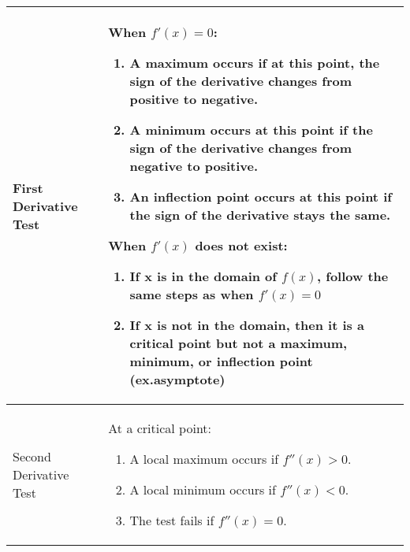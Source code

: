 \documentclass{ximera}
\begin{document}
\begin{tabular}{| l | p{7.5cm} |}
\hline
First Derivative Test & When $f'(x) = 0$: \begin{enumerate}
\item{A maximum occurs if at this point, the sign of the derivative changes from positive to negative.}
\item{A minimum occurs at this point if the sign of the derivative changes from negative to positive.}
\item{An inflection point occurs at this point if the sign of the derivative stays the same.}
\end{enumerate}
When $f'(x)$ does not exist:
\begin{enumerate}
\item{If x is in the domain of $f(x)$, follow the same steps as when $f'(x)=0$}
\item{If x is not in the domain, then it is a critical point but not a maximum, minimum, or inflection point (ex.asymptote)}
\end{enumerate}\\
\hline
Second Derivative Test &  \hspace{5mm}At a critical point: \begin{enumerate}
\item{A local maximum occurs if $f''(x)>0$.}
\item{A local minimum occurs if $f''(x)<0$.}
\item{The test fails if $f''(x)=0$.}
\end{enumerate}\\ \hline
\end{tabular}
\end{document}
